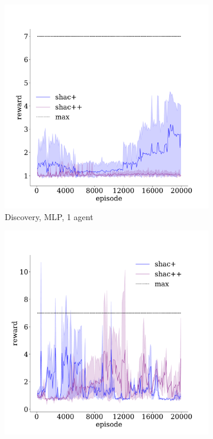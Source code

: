 \begin{figure}[!t]
    \begin{subfigure}[b]{0.30\textwidth}
        \includegraphics[width=\textwidth]{figs/discovery-ablation-1-mlp.pdf}
        \caption{Discovery, MLP, 1 agent}
        \label{fig:discovery-ablation-mlp-1}
    \end{subfigure}
    \begin{subfigure}[b]{0.30\textwidth}
        \includegraphics[width=\textwidth]{figs/discovery-ablation-3-transformer.pdf}

\end{subfigure}
\end{figure}
